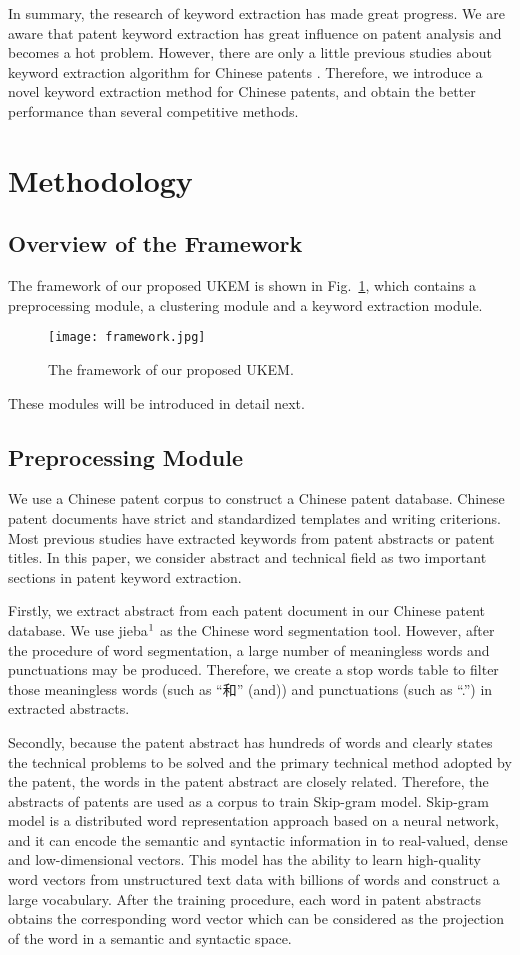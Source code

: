 \documentclass[conference]{IEEEtran}
\begin{document}
\begin{CJK}{UTF8}{gbsn}
	In summary, the research of keyword extraction has made great progress. We are aware that patent keyword extraction has great influence on patent analysis and becomes a hot problem. However, there are only a little previous studies about keyword extraction algorithm for Chinese patents \cite{b21}. Therefore, we introduce a novel keyword extraction method for Chinese patents, and obtain the better performance than several competitive methods.
	\section{Methodology}
	\subsection{Overview of the Framework}
	The framework of our proposed UKEM is shown in Fig.~\ref{framework}, which contains a preprocessing module, a clustering module and a keyword extraction module. 
	\begin{figure}[ht]
		\centering
		\texttt{[image: framework.jpg]} 
		\caption{The framework of our proposed UKEM.}
		\label{framework}
	\end{figure}
	These modules will be introduced in detail next.
	
	\subsection{Preprocessing Module}
	We use a Chinese patent corpus to construct a Chinese patent database. Chinese patent documents have strict and standardized templates and writing criterions. Most previous studies have extracted keywords from patent abstracts or patent titles. In this paper, we consider abstract and technical field as two important sections in patent keyword extraction.
	
	Firstly, we extract abstract from each patent document in our Chinese patent database. We use jieba$\footnote{\url{https://github.com/fxsjy/jieba}}$ as the Chinese word segmentation tool. However, after the procedure of word segmentation, a large number of meaningless words and punctuations may be produced. Therefore, we create a stop words table to filter those meaningless words (such as “和” (and)) and punctuations (such as “.”) in extracted abstracts.
	
	Secondly, because the patent abstract has hundreds of words and clearly states the technical problems to be solved and the primary technical method adopted by the patent, the words in the patent abstract are closely related. Therefore, the abstracts of patents are used as a corpus to train Skip-gram model. Skip-gram model is a distributed word representation approach based on a neural network, and it can encode the semantic and syntactic information in to real-valued, dense and low-dimensional vectors. This model has the ability to learn high-quality word vectors from unstructured text data with billions of words and construct a large vocabulary. After the training procedure, each word in patent abstracts obtains the corresponding word vector which can be considered as the projection of the word in a semantic and syntactic space.
	

\end{CJK}
\end{document}
